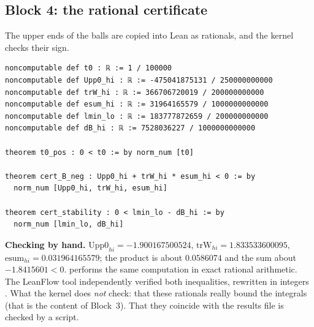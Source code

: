 \subsection{Block 4: the rational certificate}\label{ch3:sec:certificat}
The upper ends of the balls are copied into Lean as rationals, and the kernel checks their sign.
\begin{leanbox}
\begin{lstlisting}[style=chIIIlean]
noncomputable def t0 : ℝ := 1 / 100000
noncomputable def Upp0_hi : ℝ := -475041875131 / 250000000000
noncomputable def trW_hi : ℝ := 366706720019 / 200000000000
noncomputable def esum_hi : ℝ := 31964165579 / 1000000000000
noncomputable def lmin_lo : ℝ := 183777872659 / 200000000000
noncomputable def dB_hi : ℝ := 7528036227 / 1000000000000

theorem t0_pos : 0 < t0 := by norm_num [t0]

theorem cert_B_neg : Upp0_hi + trW_hi * esum_hi < 0 := by
  norm_num [Upp0_hi, trW_hi, esum_hi]

theorem cert_stability : 0 < lmin_lo - dB_hi := by
  norm_num [lmin_lo, dB_hi]
\end{lstlisting}
\end{leanbox}
\noindent \textbf{Checking by hand.} $\mathrm{Upp0}_{hi}=-1.900167500524$, $\mathrm{trW}_{hi}=1.833533600095$,
$\mathrm{esum}_{hi}=0.031964165579$; the product is about $0.0586074$ and the sum about $-1.8415601<0$.
 performs the same computation in exact rational arithmetic. The LeanFlow tool 
independently verified both inequalities, rewritten in integers \tierAs. What the kernel does \emph{not} check:
that these rationals really bound the integrals (that is the \tierC{} content of Block~3). That they coincide with the
results file is checked by a script.

